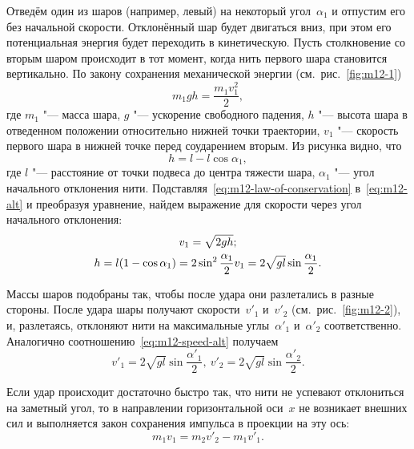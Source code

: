 \documentclass[a4paper, 12pt]{extarticle}
\begin{document}
Отведём один из шаров (например, левый) на  некоторый угол~$\alpha_1$ и отпустим его без начальной скорости. Отклонённый шар будет двигаться  вниз, при этом его потенциальная энергия будет переходить в кинетическую. Пусть столкновение со вторым шаром происходит в тот момент, когда нить первого шара становится вертикально. По закону сохранения механической энергии (см.~рис.~\ref{fig:m12-1})
\begin{equation}
\label{eq:m12-law-of-conservation}
m_1 g h = \frac{m_1 v_1^2}{2},
\end{equation}
где $m_1$ "--- масса шара, $g$ "--- ускорение свободного падения, $h$ "--- высота шара в отведенном  положении относительно нижней точки траектории, $v_1$ "--- скорость первого шара в нижней точке перед соударением вторым. %
Из рисунка видно, что
\begin{equation}
\label{eq:m12-alt}
h = l - l \cos \alpha_1,
\end{equation}
где $l$ "--- расстояние от точки подвеса до центра тяжести шара, $\alpha_1$ "--- угол начального отклонения нити. Подставляя~\eqref{eq:m12-law-of-conservation} в~\eqref{eq:m12-alt} и преобразуя уравнение, найдем выражение для скорости через угол начального отклонения: %
\begin{equation}
\label{eq:m12-speed-alt}
\gathered
v_1 = \sqrt{2gh}; \\
h = l (1 - \cos \alpha_1) = 2 \sin^2 \frac{\alpha_1}{2} v_1 = 2 \sqrt{gl} \sin \frac{\alpha_1}{2}.
\endgathered
\end{equation}

Массы шаров подобраны так, чтобы после удара они разлетались в разные стороны. После удара шары получают скорости~$v'_1$  и~$v'_2$  (см.~рис.~\ref{fig:m12-2}), и, разлетаясь, отклоняют нити на максимальные углы~$\alpha'_1$ и~$\alpha'_2$ соответственно. Аналогично соотношению~\eqref{eq:m12-speed-alt} получаем
\begin{equation}
\label{eq:m12-final-speed}
v'_1 = 2 \sqrt{gl} \sin \frac{\alpha'_1}{2}, \ v'_2 = 2 \sqrt{gl} \sin \frac{\alpha'_2}{2}.
\end{equation}

Если удар происходит достаточно быстро так, что нити не успевают отклониться на заметный угол, то в направлении горизонтальной оси~$x$ не возникает внешних сил и выполняется закон сохранения импульса в проекции на эту ось: 
\begin{equation}
\label{eq:m12-momentum}
m_1 v_1 = m_2 v'_2 - m_1 v'_1.
\end{equation}
\end{document}
